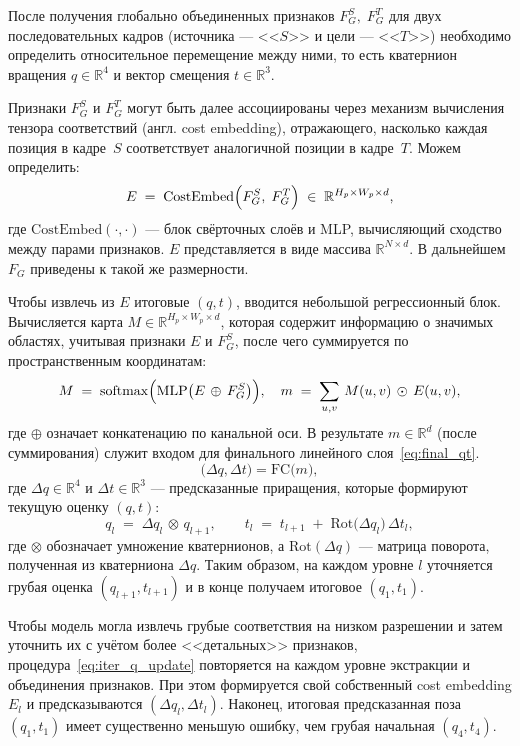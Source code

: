 После получения глобально объединенных признаков ${F}_G^S,\;{F}_G^T$
для двух последовательных кадров (источника --- <<$S$>> и цели --- <<$T$>>) 
необходимо определить относительное перемещение между ними, то есть 
кватернион вращения ${q}\in\mathbb{R}^4$ и вектор смещения ${t}\in\mathbb{R}^3$.

Признаки ${F}_G^S$ и ${F}_G^T$ могут быть далее ассоциированы через механизм вычисления тензора соответствий 
(англ. cost embedding), отражающего, насколько каждая позиция в кадре~$S$ соответствует аналогичной позиции в кадре~$T$. 
Можем определить:
\[
  {E}
  \;=\;
  \mathrm{CostEmbed}\Bigl({F}_G^S,\;{F}_G^T\Bigr)
  \;\in\;\mathbb{R}^{H_p \times W_p \times {d}},
\]
где $\mathrm{CostEmbed}(\cdot,\cdot)$ --- блок свёрточных слоёв и MLP, вычисляющий сходство между парами признаков. 
${E}$ представляется в виде массива $\mathbb{R}^{N\times d}$. В дальнейшем $F_G$ приведены к такой же размерности.

Чтобы извлечь из ${E}$ итоговые $({q},{t})$, вводится небольшой регрессионный блок. 
Вычисляется карта ${M}\in\mathbb{R}^{H_p \times W_p \times d}$, которая содержит информацию о значимых областях,
учитывая признаки ${E}$ и ${F}_G^S$, после чего суммируется по пространственным координатам:
\[
  {M} \;=\; \mathrm{softmax}\Bigl(\mathrm{MLP}\bigl({E}\,\oplus\,{F}_G^S\bigr)\Bigr),
  \quad
  {m} \;=\;
    \sum_{u,v}\,
      {M}(u,v)\,\odot\,{E}(u,v),
\]
где $\oplus$ означает конкатенацию по канальной оси. В результате ${m}\in\mathbb{R}^{d}$ (после суммирования) служит входом для финального линейного слоя~\eqref{eq:final_qt}.
\begin{equation}
  \label{eq:final_qt}
  \bigl(\Delta {q}, \Delta {t}\bigr)
  =
  \mathrm{FC}\bigl({m}\bigr),
\end{equation}
где $\Delta {q}\in\mathbb{R}^4$ и $\Delta {t}\in\mathbb{R}^3$ --- предсказанные приращения, которые формируют текущую оценку $({q},{t})$:
\begin{equation}
\label{eq:iter_q_update}
  {q}_{l} 
  \;=\; 
  \Delta {q}_{l}\,\otimes\,{q}_{l+1}, 
  \qquad
  {t}_{l}
  \;=\; 
  {t}_{l+1} 
  \;+\; \mathrm{Rot}\bigl(\Delta {q}_{l}\bigr)\,\Delta {t}_{l},
\end{equation}
где $\otimes$ обозначает умножение кватернионов, а $\mathrm{Rot}(\Delta {q})$ --- матрица поворота, полученная из кватерниона $\Delta {q}$. 
Таким образом, на каждом уровне $l$ уточняется грубая оценка $({q}_{l+1}, {t}_{l+1})$ 
и в конце получаем итоговое $({q}_1, {t}_1)$.

Чтобы модель могла извлечь грубые соответствия на низком разрешении и затем уточнить их с учётом более <<детальных>> признаков, 
процедура~\eqref{eq:iter_q_update} повторяется на каждом уровне экстракции и объединения признаков. 
При этом формируется свой собственный cost embedding ${E}_l$ и предсказываются $(\Delta {q}_l, \Delta {t}_l)$. 
Наконец, итоговая предсказанная поза $({q}_1, {t}_1)$ имеет существенно меньшую ошибку, чем грубая начальная $({q}_4, {t}_4)$.

